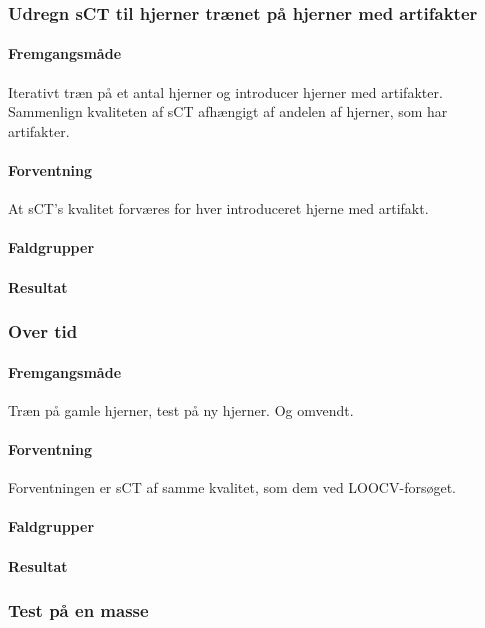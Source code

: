 \subsubsection{Udregn sCT til hjerner trænet på hjerner med artifakter}
\paragraph{Fremgangsmåde}
Iterativt træn på et antal hjerner og introducer hjerner med artifakter.
Sammenlign kvaliteten af sCT afhængigt af andelen af hjerner, som har
artifakter.

\paragraph{Forventning}
At sCT's kvalitet forværes for hver introduceret hjerne med artifakt.

\paragraph{Faldgrupper}

\paragraph{Resultat}


\subsubsection{Over tid}
\paragraph{Fremgangsmåde}
Træn på gamle hjerner, test på ny hjerner. Og omvendt.

\paragraph{Forventning}
Forventningen er sCT af samme kvalitet, som dem ved LOOCV-forsøget.

\paragraph{Faldgrupper}


\paragraph{Resultat}

\subsubsection{Test på en masse}
